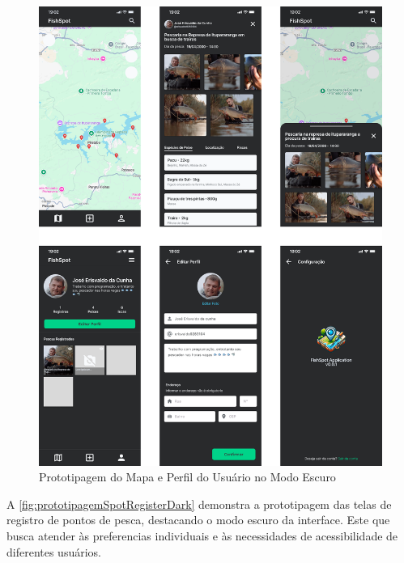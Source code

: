 \begin{figure}[H]
    \centering
    \caption{Prototipagem do Mapa e Perfil do Usuário no Modo Escuro}
    \label{fig:prototipagemMapPerfilDark}
    \includegraphics[scale=0.30]{./dados/figuras/prototipagem-dark-map-perfil.png}
\end{figure}

A \autoref{fig:prototipagemSpotRegisterDark} demonstra a prototipagem das telas de registro de pontos de pesca, destacando o modo escuro da interface. Este que busca atender às preferencias individuais e às necessidades de acessibilidade de diferentes usuários.


